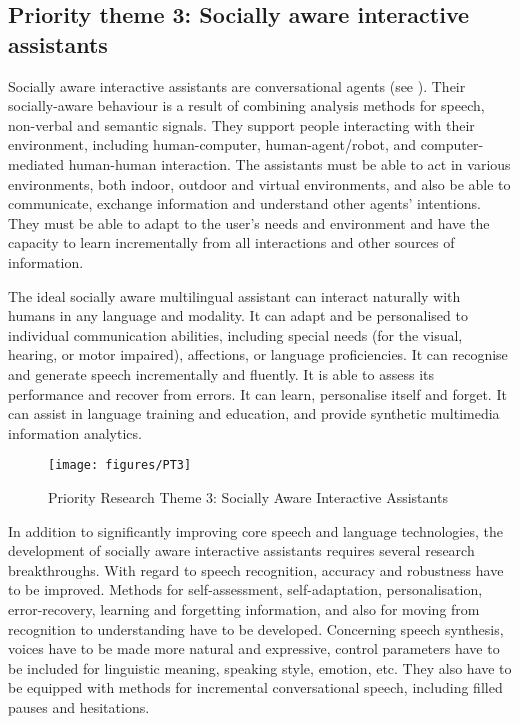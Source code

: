 \documentclass[output=paper]{LSP/langsci}
\begin{document}
\subsection{Priority theme 3: Socially aware interactive assistants}
\label{sec:priority-theme-3-interactive-assistant}

Socially aware interactive assistants are conversational agents (see
). Their socially-aware behaviour is a
result of combining analysis methods for speech, non-verbal and
semantic signals. They support people interacting with their
environment, including human-computer, human-agent/robot, and
com\-pu\-ter-mediated human-human interaction. The assistants must be able
to act in various environments, both indoor, outdoor and virtual
environments, and also be able to communicate, exchange information
and understand other agents' intentions. They must be able to adapt to
the user's needs and environment and have the capacity to learn
incrementally from all interactions and other sources of information.
\largerpage %

The ideal socially aware multilingual assistant can interact naturally
with humans in any language and modality. It can adapt and be
personalised to individual communication abilities, including special
needs (for the visual, hearing, or motor impaired), affections, or
language proficiencies. It can recognise and generate speech
incrementally and fluently. It is able to assess its performance and
recover from errors. It can learn, personalise itself and forget. It
can assist in language training and education, and provide synthetic
multimedia information analytics.

\begin{figure*}[htb]
  \center
  \texttt{[image: figures/PT3]}
  \caption{Priority Research Theme 3: Socially Aware Interactive Assistants}
  \label{fig:pt3-overview}
\end{figure*}

In addition to significantly improving core speech and language
technologies, the development of socially aware interactive assistants
requires several research breakthroughs. With regard to speech
recognition, accuracy and robustness have to be improved. Methods for
self-assessment, self-adaptation, personalisation, error-recovery,
learning and forgetting information, and also for moving from
recognition to understanding have to be developed. Concerning speech
synthesis, voices have to be made more natural and expressive, control
parameters have to be included for linguistic meaning, speaking style,
emotion, etc. They also have to be equipped with methods for
incremental conversational speech, including filled pauses and
hesitations. 
\end{document}
